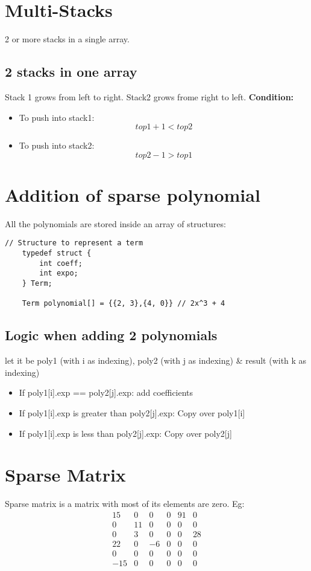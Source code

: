 \documentclass{article}
\begin{document}
\section{Multi-Stacks}
2 or more stacks in a single array.

\subsection{2 stacks in one array}

Stack 1 grows from left to right.
Stack2 grows frome right to left. \textbf{Condition:}

\begin{itemize}
    \item To push into stack1: \[top1 + 1 < top2\]
    \item To push into stack2: \[top2 - 1 > top1\]
\end{itemize}

\section{Addition of sparse polynomial}

All the polynomials are stored inside an array of structures:
\begin{lstlisting}[caption={Sparse Polynomial Addition Outline}]
    // Structure to represent a term
    typedef struct {
        int coeff;
        int expo;
    } Term;

    Term polynomial[] = {{2, 3},{4, 0}} // 2x^3 + 4
\end{lstlisting}

\subsection{Logic when adding 2 polynomials}
let it be poly1 (with i as indexing),  poly2 (with j as indexing) \&  result (with k as indexing)

\begin{itemize}
    \item If poly1[i].exp ==  poly2[j].exp: add coefficients
    \item If poly1[i].exp is greater than poly2[j].exp: Copy over poly1[i]
    \item If poly1[i].exp is less than poly2[j].exp: Copy over poly2[j]
\end{itemize}

\section{Sparse Matrix}
Sparse matrix is a matrix with most of its elements are zero. Eg:
\[
\begin{matrix}
15 & 0  & 0  & 0  & 91 & 0  \\
0  & 11 & 0  & 0  & 0  & 0  \\
0  & 3  & 0  & 0  & 0  & 28 \\
22 & 0  & -6 & 0  & 0  & 0  \\
0  & 0  & 0  & 0  & 0  & 0  \\
-15& 0  & 0  & 0  & 0  & 0  \\
\end{matrix}
\]
\end{document}
